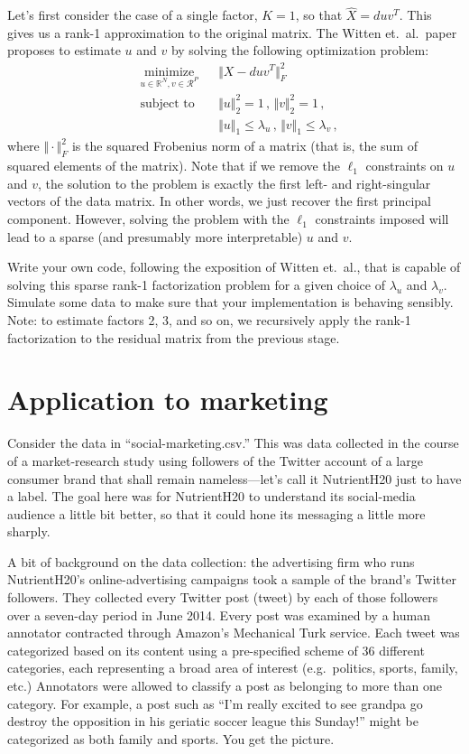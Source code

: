 \documentclass{mynotes}
\newcommand{\R}{\mathbb{R}}
\begin{document}
Let's first consider the case of a single factor, $K=1$, so that $\hat{X} = d u v^T$.  This gives us a rank-1 approximation to the original matrix. The Witten et.~al.~paper proposes to estimate $u$ and $v$ by solving the following optimization problem:
\begin{equation}
\begin{aligned}
& \underset{u \in \R^N, v \in \mathcal{R}^P}{\text{minimize}}
& & 
\Vert X - d u v^T \Vert_F^2 \\
& \text{subject to}
& & \Vert u \Vert_2^2 = 1 \, , \, \Vert v \Vert_2^2 = 1 \, , \\
 & & & \Vert u \Vert_1 \leq \lambda_u \, , \, \Vert v \Vert_1 \leq \lambda_v \, ,
\end{aligned}
\end{equation}
where $\Vert \cdot \Vert_F^2$ is the squared Frobenius norm of a matrix (that is, the sum of squared elements of the matrix).  Note that if we remove the $\ell_1$ constraints on $u$ and $v$, the solution to the problem is exactly the first left- and right-singular vectors of the data matrix.  In other words, we just recover the first principal component.  However, solving the problem with the $\ell_1$ constraints imposed will lead to a sparse (and presumably more interpretable) $u$ and $v$.

Write your own code, following the exposition of Witten et.~al., that is capable of solving this sparse rank-1 factorization problem for a given choice of $\lambda_u$ and $\lambda_v$.  Simulate some data to make sure that your implementation is behaving sensibly.  Note: to estimate factors 2, 3, and so on, we recursively apply the rank-1 factorization to the residual matrix from the previous stage.

\section{Application to marketing}

Consider the data in ``social-marketing.csv.''  This was data collected in the course of a market-research study using followers of the Twitter account of a large consumer brand that shall remain nameless---let's call it NutrientH20 just to have a label. The goal here was for NutrientH20 to understand its social-media audience a little bit better, so that it could hone its messaging a little more sharply.

A bit of background on the data collection: the advertising firm who runs NutrientH20's online-advertising campaigns took a sample of the brand's Twitter followers. They collected every Twitter post (tweet) by each of those followers over a seven-day period in June 2014. Every post was examined by a human annotator contracted through Amazon's Mechanical Turk service. Each tweet was categorized based on its content using a pre-specified scheme of 36 different categories, each representing a broad area of interest (e.g.~politics, sports, family, etc.) Annotators were allowed to classify a post as belonging to more than one category. For example, a post such as ``I'm really excited to see grandpa go destroy the opposition in his geriatic soccer league this Sunday!'' might be categorized as both family and sports. You get the picture.
\end{document}
